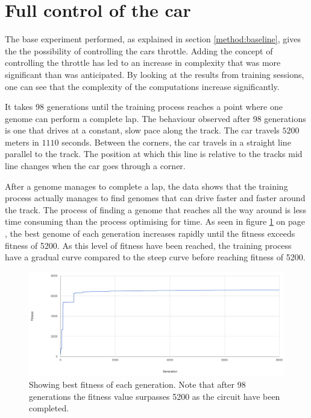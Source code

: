 

\section{Full control of the car}



The base experiment performed, as explained in section \ref{method:baseline}, gives the the possibility of controlling the cars throttle. Adding the concept of controlling the throttle has led to an increase in complexity that was more significant than was anticipated. By looking at the results from training sessions, one can see that the complexity of the computations increase significantly.

It takes 98 generations until the training process reaches a point where one genome can perform a complete lap. The behaviour observed after 98 generations is one that drives at a constant, slow pace along the track. The car travels $5200$ meters in $1110$ seconds. Between the corners, the car travels in a straight line parallel to the track. The position at which this line is relative to the tracks mid line changes when the car goes through a corner.

After a genome manages to complete a lap, the data shows that the training process actually manages to find genomes that can drive faster and faster around the track. The process of finding a genome that reaches all the way around is less time consuming than the process optimising for time. As seen in figure \ref{fig:steerspeeddata} on page \pageref{fig:steerspeeddata}, the best genome of each generation increases rapidly until the fitness exceeds fitness of 5200. As this level of fitness have been reached, the training process have a gradual curve compared to the steep curve before reaching fitness of 5200.

\begin{figure}[h]
\includegraphics[width=\textwidth]{report/images/graphs/steeringandspeedcontrolrun1}
\centering
\caption{Showing best fitness of each generation. Note that after 98 generations the fitness value surpasses 5200 as the circuit have been completed.}
\label{fig:steerspeeddata}
\end{figure}

